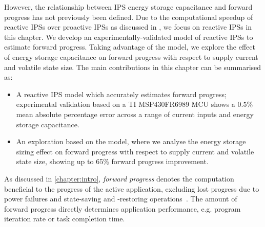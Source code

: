 
However, the relationship between IPS energy storage capacitance and forward progress has not previously been defined.
Due to the computational speedup of reactive IPSs over proactive IPSs as discussed in , we focus on reactive IPSs in this chapter. 
We develop an experimentally-validated model of reactive IPSs to estimate forward progress. 
Taking advantage of the model, we explore the effect of energy storage capacitance on forward progress with respect to supply current and volatile state size. 
The main contributions in this chapter can be summarised as:
\begin{itemize}
    \item A reactive IPS model which accurately estimates forward progress; experimental validation based on a TI MSP430FR6989 MCU shows a 0.5\% mean absolute percentage error across a range of current inputs and energy storage capacitance. 
	\item An exploration based on the model, where we analyse the energy storage sizing effect on forward progress with respect to supply current and volatile state size, showing up to 65\% forward progress improvement.
\end{itemize}

As discussed in \cref{chapter:intro}, \textit{forward progress} denotes the computation beneficial to the progress of the active application, excluding lost progress due to power failures and state-saving and -restoring operations~\cite{7478428}. 
The amount of forward progress directly determines application performance, e.g. program iteration rate or task completion time. 

